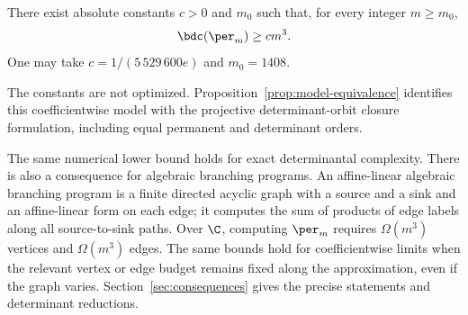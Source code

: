 \begin{theorem}
\label{thm:main}
There exist absolute constants $c>0$ and $m_0$ such that, for every integer
$m\ge m_0$,
\[
 \bdc(\per_m)\ge c m^3.
\]
One may take $c=1/(5\,529\,600e)$ and $m_0=1408$.
\end{theorem}

The constants are not optimized. Proposition~\ref{prop:model-equivalence}
identifies this coefficientwise model with the projective determinant-orbit
closure formulation, including equal permanent and determinant orders.

The same numerical lower bound holds for exact determinantal complexity.
There is also a consequence for algebraic branching programs. An
affine-linear algebraic branching program is a finite directed acyclic
graph with a source and a sink and an affine-linear form on each edge; it
computes the sum of products of edge labels along all source-to-sink paths.
Over $\C$, computing $\per_m$ requires $\Omega(m^3)$ vertices and
$\Omega(m^3)$ edges. The same bounds hold for coefficientwise limits when
the relevant vertex or edge budget remains fixed along the approximation,
even if the graph varies. Section~\ref{sec:consequences} gives the precise
statements and determinant reductions.

